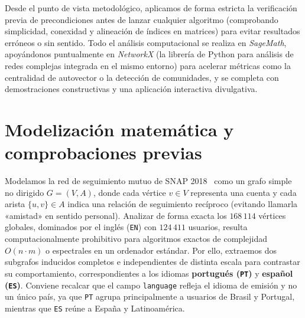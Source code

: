 \documentclass[11pt,a4paper]{article}
\begin{document}
Desde el punto de vista metodológico, aplicamos de forma estricta la verificación previa de precondiciones antes de lanzar cualquier algoritmo (comprobando simplicidad, conexidad y alineación de índices en matrices) para evitar resultados erróneos o sin sentido. Todo el análisis computacional se realiza en \textit{SageMath}, apoyándonos puntualmente en \textit{NetworkX} (la librería de Python para análisis de redes complejas integrada en el mismo entorno) para acelerar métricas como la centralidad de autovector o la detección de comunidades, y se completa con demostraciones constructivas y una aplicación interactiva divulgativa.

\section{Modelización matemática y comprobaciones previas}

Modelamos la red de seguimiento mutuo de SNAP 2018~\cite{rozemberczki2021} como un grafo simple no dirigido $G = (V, A)$, donde cada vértice $v \in V$ representa una cuenta y cada arista $\{u,v\} \in A$ indica una relación de seguimiento recíproco (evitando llamarla «amistad» en sentido personal). Analizar de forma exacta los $168\,114$ vértices globales, dominados por el inglés (\texttt{EN}) con $124\,411$ usuarios, resulta computacionalmente prohibitivo para algoritmos exactos de complejidad $O(n \cdot m)$ o espectrales en un ordenador estándar. Por ello, extraemos dos subgrafos inducidos completos e independientes de distinta escala para contrastar su comportamiento, correspondientes a los idiomas \textbf{portugués (\texttt{PT})} y \textbf{español (\texttt{ES})}. Conviene recalcar que el campo \texttt{language} refleja el idioma de emisión y no un único país, ya que \texttt{PT} agrupa principalmente a usuarios de Brasil y Portugal, mientras que \texttt{ES} reúne a España y Latinoamérica.
\end{document}

